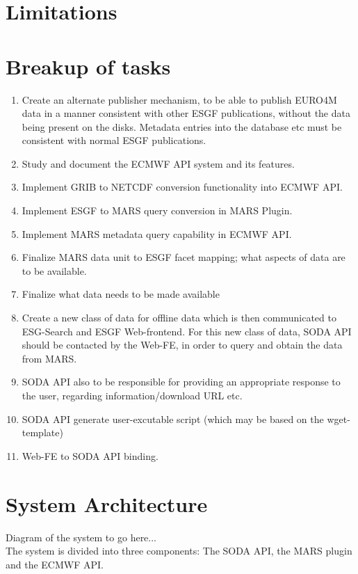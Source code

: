 \documentclass[oneside,12pt]{memoir}
\def\phname{SODA API{ }}
\begin{document}
\section{Limitations}
\section{Breakup of tasks}
\begin{enumerate}
\item Create an alternate publisher mechanism, to be able to publish EURO4M data in a manner consistent with other ESGF publications, without the data being present on the disks. Metadata entries into the database etc must be consistent with normal ESGF publications.
\item Study and document the ECMWF API system and its features.
\item Implement GRIB to NETCDF conversion functionality into  ECMWF API.
\item Implement ESGF to MARS query conversion in MARS Plugin.
\item Implement MARS metadata query capability in ECMWF API.
\item Finalize MARS data unit to ESGF facet mapping; what aspects of data are to be available.
\item Finalize what data needs to be made available
\item Create a new class of data for offline data which is then communicated to ESG-Search and ESGF Web-frontend. For this new class of data, \phname should be contacted by the Web-FE, in order to query and obtain the data from MARS. 
\item \phname also to be responsible for providing an appropriate response to the user, regarding information/download URL etc.
\item \phname generate user-excutable script (which may be based on the wget-template)
\item Web-FE to \phname binding.
\end{enumerate}
\section{System Architecture}
Diagram of the system to go here...\\
The system is divided into three components: The SODA API, the MARS plugin and the ECMWF API. \\
\end{document}
